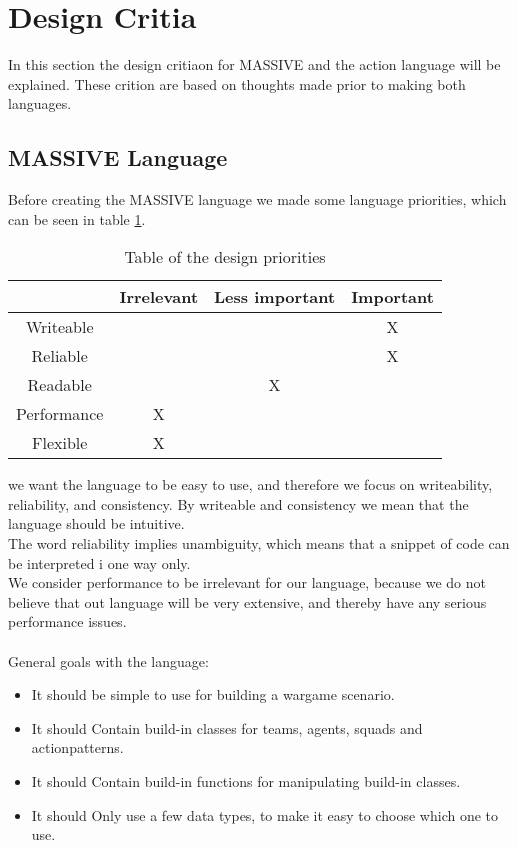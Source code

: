 \section{Design Critia}
\label{sec:designcrit}
In this section the design critiaon for MASSIVE and the action language will be explained. These crition are based on thoughts made prior to making both languages.

\subsection{MASSIVE Language}
Before creating the MASSIVE language we made some language priorities, which can be seen in table \ref{table:priorities}.

\begin{table}[ht]
\caption{Table of the design priorities} %
\centering %
\begin{tabular}{cccc} %
\hline\hline %
 & Irrelevant & Less important & Important \\ [0.5ex] %
\hline %
Writeable &  &  & X\\ %
Reliable &  &  & X\\
Readable &  & X & \\
Performance & X &  & \\
Flexible & X &  & \\ [1ex] %
\hline %
\end{tabular} 
\label{table:priorities} %
\end{table}

we want the language to be easy to use, and therefore we focus on writeability, reliability, and consistency. By writeable and consistency we mean that the language should be intuitive.\\
The word reliability implies unambiguity, which means that a snippet of code can be interpreted i one way only.\\ \indent
We consider performance to be irrelevant for our language, because we do not believe that out language will be very extensive, and thereby have any serious performance issues.\\ \\
General goals with the language:

\begin{itemize}
	\item It should be simple to use for building a wargame scenario.
	\item It should Contain build-in classes for teams, agents, squads and actionpatterns.
	\item It should Contain build-in functions for manipulating build-in classes.
	\item It should Only use a few data types, to make it easy to choose which one to use.
\end{itemize}

